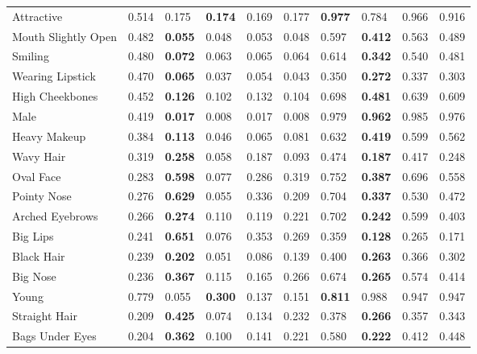 \begin{tabular}{lrllrrllrr}
\hline
 Attractive          & 0.514 & 0.175     & \bf 0.174 & 0.169 & 0.177 & \bf 0.977 & 0.784     & 0.966 & 0.916 \\
 Mouth Slightly Open & 0.482 & \bf 0.055 & 0.048     & 0.053 & 0.048 & 0.597     & \bf 0.412 & 0.563 & 0.489 \\
 Smiling             & 0.480 & \bf 0.072 & 0.063     & 0.065 & 0.064 & 0.614     & \bf 0.342 & 0.540 & 0.481 \\
 Wearing Lipstick    & 0.470 & \bf 0.065 & 0.037     & 0.054 & 0.043 & 0.350     & \bf 0.272 & 0.337 & 0.303 \\
 High Cheekbones     & 0.452 & \bf 0.126 & 0.102     & 0.132 & 0.104 & 0.698     & \bf 0.481 & 0.639 & 0.609 \\
 Male                & 0.419 & \bf 0.017 & 0.008     & 0.017 & 0.008 & 0.979     & \bf 0.962 & 0.985 & 0.976 \\
 Heavy Makeup        & 0.384 & \bf 0.113 & 0.046     & 0.065 & 0.081 & 0.632     & \bf 0.419 & 0.599 & 0.562 \\
 Wavy Hair           & 0.319 & \bf 0.258 & 0.058     & 0.187 & 0.093 & 0.474     & \bf 0.187 & 0.417 & 0.248 \\
 Oval Face           & 0.283 & \bf 0.598 & 0.077     & 0.286 & 0.319 & 0.752     & \bf 0.387 & 0.696 & 0.558 \\
 Pointy Nose         & 0.276 & \bf 0.629 & 0.055     & 0.336 & 0.209 & 0.704     & \bf 0.337 & 0.530 & 0.472 \\
 Arched Eyebrows     & 0.266 & \bf 0.274 & 0.110     & 0.119 & 0.221 & 0.702     & \bf 0.242 & 0.599 & 0.403 \\
 Big Lips            & 0.241 & \bf 0.651 & 0.076     & 0.353 & 0.269 & 0.359     & \bf 0.128 & 0.265 & 0.171 \\
 Black Hair          & 0.239 & \bf 0.202 & 0.051     & 0.086 & 0.139 & 0.400     & \bf 0.263 & 0.366 & 0.302 \\
 Big Nose            & 0.236 & \bf 0.367 & 0.115     & 0.165 & 0.266 & 0.674     & \bf 0.265 & 0.574 & 0.414 \\
 Young               & 0.779 & 0.055     & \bf 0.300 & 0.137 & 0.151 & \bf 0.811 & 0.988     & 0.947 & 0.947 \\
 Straight Hair       & 0.209 & \bf 0.425 & 0.074     & 0.134 & 0.232 & 0.378     & \bf 0.266 & 0.357 & 0.343 \\
 Bags Under Eyes     & 0.204 & \bf 0.362 & 0.100     & 0.141 & 0.221 & 0.580     & \bf 0.222 & 0.412 & 0.448 \\

\end{tabular}
